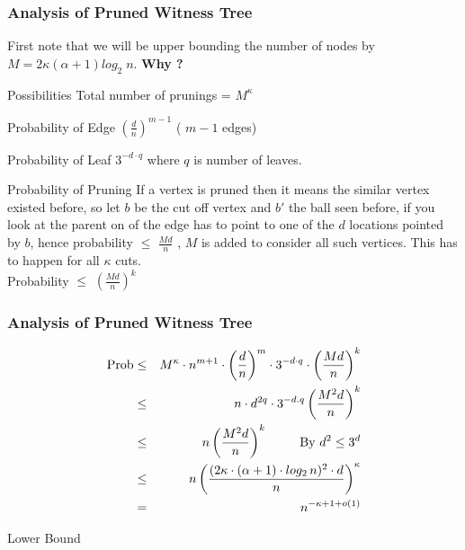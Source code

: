 \documentclass{beamer}
\begin{document}
\begin{frame}
\frametitle{Analysis of Pruned Witness Tree}
First note that we will be upper bounding the number of nodes by $M=2 \kappa (\alpha +1) log_2 \; n$. \textbf{Why ?}
\begin{block}
{Possibilities} Total number of prunings = $M^{\kappa}$
\end{block}
\begin{block}
{Probability of Edge} $\left( \frac{d}{n} \right) ^{m-1}$ ( $m-1$ edges) 
\end{block}
\begin{block}
{Probability of Leaf} $3^{-d \cdot q}$ where $q$ is number of leaves. 
\end{block}
\begin{block}
{Probability of Pruning} If a vertex is pruned then it means the similar vertex existed before, so let $b$ be the cut off vertex and $b'$ the ball seen before, if you look at the parent on of the edge has to point to one of the $d$ locations pointed by $b$, hence probability $\leq$ $\frac{Md}{n}$ , $M$ is added to consider all such vertices. This has to happen for all $\kappa$ cuts. \\
Probability $\leq$ $\left( \frac{Md}{n}\right)^k$
\end{block}
\end{frame}


\begin{frame}
\frametitle{Analysis of Pruned Witness Tree}
\begin{eqnarray}
 \text{Prob} & \leq & M^\kappa \cdot n^{m+1} \cdot \left( \frac{d}{n} \right)^m \cdot 3^{-d \cdot q} \cdot \left( \frac{Md}{n}\right)^k \\
& \leq& n \cdot d^{2q} \cdot 3 ^{-d.q}  \left( \frac{M^2d}{n}\right)^k \\
& \leq & n \left( \frac{M^2d}{n}\right)^k \; \; \; \; \; \; \; \; \text{                    By $ d^2 \leq 3^d$} \\
& \leq & n \left( \frac{(2 \kappa \cdot (\alpha +1) \cdot log_2 \, n)^2 \cdot d}{n}\right)^\kappa \\
& = & n^{-\kappa +1 + o(1)}
\end{eqnarray}
\end{frame}

\begin{frame}
 \begin{center}
  Lower Bound
 \end{center}
\end{frame}
\end{document}
